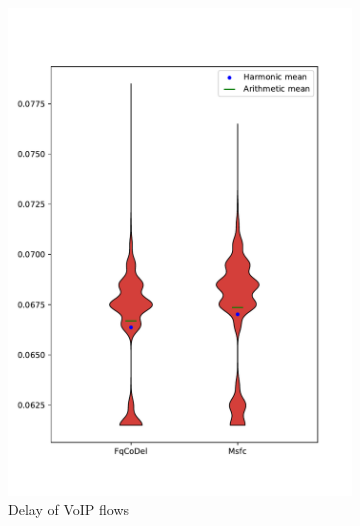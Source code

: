 \begin{figure}
	\centering
	\begin{subfigure}[b]{0.475\textwidth}
		\centering
		\includegraphics[width=\textwidth]{drawings/type1-delay-down}
		\caption[]%
		{{\small Delay of VoIP flows}}    
		\label{fig:delay_voip}
	\end{subfigure}
	\hfill
	\begin{subfigure}[b]{0.475\textwidth}  
		\centering 

\end{subfigure}
\end{figure}
